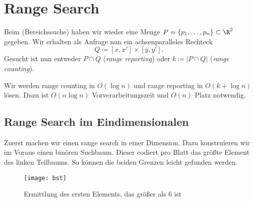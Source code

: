 \section{Range Search}

Beim  (Bereichssuche) haben wir wieder eine Menge \( P = \left \{ p_1, \dots, p_n \right \} \subset \R^2 \) gegeben. Wir erhalten als Anfrage nun ein achsenparalleles Rechteck
\begin{equation*}
  Q \coloneqq [x,x'] \times [y,y']\text{.}
\end{equation*}
Gesucht ist nun entweder \( P \cap Q \) (\emph{range reporting}) oder \( k \coloneqq \left\vert P \cap Q \right\vert \) (\emph{range counting}).

Wir werden range counting in \( O(\log n) \) und range reporting in \( O(k+\log n) \) lösen. Dazu ist \( O(n\log n) \) Vorverarbeitungszeit und \( O(n) \) Platz notwendig.

\subsection{Range Search im Eindimensionalen}

\begin{minipage}{.55\textwidth}
  Zuerst machen wir einen range search in einer Dimension. Dazu konstruieren wir im Voraus einen binören Suchbaum. Dieser codiert pro Blatt das größte Element des linken Teilbaums. So können die beiden Grenzen leicht gefunden werden.
  \vspace*{1em}
\end{minipage}
\hfill
\begin{minipage}{.4\textwidth}
  \begin{figure}[H]
    \texttt{[image: bst]}
    \caption{Ermittlung des ersten Elements, das größer als \( 6 \) ist}
  \end{figure}
  \vspace*{1em}
\end{minipage}